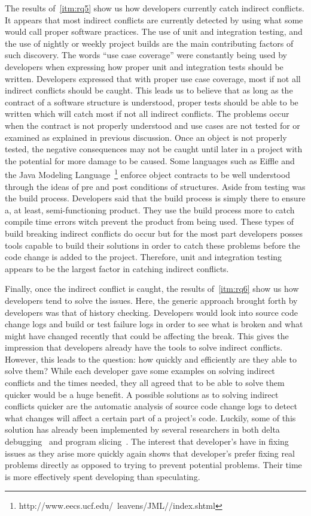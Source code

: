 \documentclass[conference]{IEEEtran}
\begin{document}
The results of~\ref{itm:rq5} show us how developers currently catch indirect conflicts. It appears that most indirect conflicts are currently
detected by using what some would call proper software practices. The use of unit and integration testing, and the use of nightly or weekly
project builds are the main contributing factors of such discovery. The words ``use case coverage'' were constantly being used by developers
when expressing how proper unit and integration tests should be written. Developers expressed that with proper use case coverage, most if
not all indirect conflicts should be caught. This leads us to believe that as long as the contract of a software structure is understood,
proper tests should be able to be written which will catch most if not all indirect conflicts. The problems occur when the contract is
not properly understood and use cases are not tested for or examined as explained in previous discussion. Once an object is not properly
tested, the negative consequences may not be caught until later in a project with the potential for more damage to be caused. Some languages
such as Eiffle and the Java Modeling Language~\footnote{http://www.eecs.ucf.edu/~leavens/JML//index.shtml}
enforce object contracts to be well understood through the ideas of pre and post conditions of structures. Aside from testing
was the build process. Developers said that the build process is simply there to ensure a, at least, semi-functioning product. They use
the build process more to catch compile time errors witch prevent the product from being used. These types of build breaking indirect
conflicts do occur but for the most part developers posses tools capable to build their solutions in order to catch these problems before
the code change is added to the project. Therefore, unit and integration testing appears to be the largest factor in catching indirect conflicts.

Finally, once the indirect conflict is caught, the results of~\ref{itm:rq6} show us how developers tend to solve the issues. Here, the generic approach
brought forth by developers was that of history checking. Developers would look into source code change logs and build or test failure
logs in order to see what is broken and what might have changed recently that could be affecting the break. This gives the impression that
developers already have the tools to solve indirect conflicts. However, this leads to the question: how quickly and
efficiently are they able to solve them?
While each developer gave some examples on solving indirect conflicts and the times needed, they all agreed that to be able to solve them
quicker would be a huge benefit. A possible solutions as to solving indirect conflicts quicker are the automatic analysis of source code
change logs to detect what changes will affect a certain part of a project's code. Luckily, some of this solution has already been implemented
by several researchers in both delta debugging~\cite{Zeller:2002:ICC} and program slicing~\cite{Weiser:1982:PUS}. 
The interest that developer's have in fixing issues as they
arise more quickly again shows that developer's prefer fixing real problems directly as opposed to trying to prevent potential problems.
Their time is more effectively spent developing than speculating. 
\end{document}
